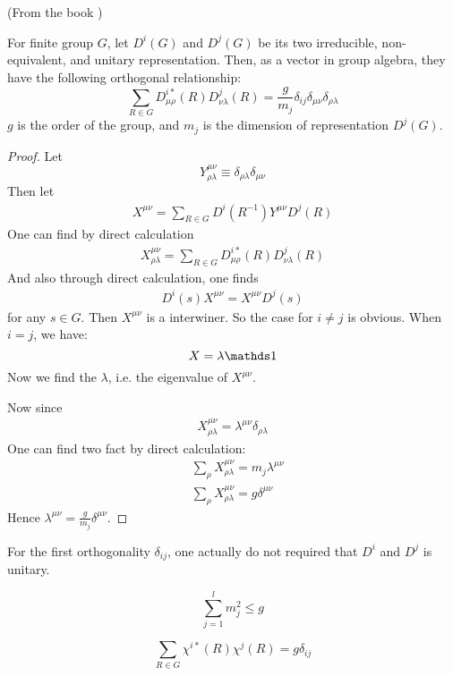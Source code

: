 (From the book \cite{book})
\begin{thm}
    For finite group $G$, let $D^i(G)$ and $D^j(G)$ be its two
    irreducible, non-equivalent, and unitary representation. Then, as
    a vector in group algebra, they have the following orthogonal
    relationship:
    \begin{equation}
        \sum_{R\in G} D^{i*}_{\mu\rho}(R)D^j_{\nu \lambda}(R) =
        \frac{g}{m_j} \delta_{ij} \delta_{\mu\nu}\delta_{\rho\lambda}
    \end{equation}
    $g$ is the order of the group, and $m_j$ is the
    dimension of representation $D^j(G)$.
\end{thm}
\begin{proof}
    Let
    \begin{equation}
        Y_{\rho\lambda}^{\mu\nu} \equiv
        \delta_{\rho\lambda}\delta_{\mu\nu}
    \end{equation}
    Then let
    \begin{align*}
        X^{\mu\nu} = \sum_{R\in G} D^i(R^{-1}) Y^{\mu\nu} D^j(R)
    \end{align*}
    One can find by direct calculation
    \begin{align}
        X^{\mu\nu}_{\rho\lambda}= \sum_{R\in G}
        D^{i*}_{\mu\rho}(R)D^j_{\nu \lambda}(R)
    \end{align}
    And also through direct calculation, one finds
    \begin{align*}
        D^i (s) X^{\mu\nu} = X^{\mu\nu} D^j(s)
    \end{align*}
    for any $s\in G$. 
    Then $X^{\mu\nu}$ is a interwiner. So the case for $i\neq j$ is
    obvious. When $i=j$, we have:
    $$ X = \lambda \id$$
    Now we find the $\lambda$, i.e. the eigenvalue of $X^{\mu\nu}$.
    
    Now since
    \begin{align*}
        X^{\mu\nu}_{\rho\lambda} = \lambda^{\mu\nu}
        \delta_{\rho\lambda}
    \end{align*}
    One can find two fact by direct calculation:
    \begin{align*}
        &\sum_\rho X^{\mu\nu}_{\rho\lambda} = m_j \lambda^{\mu\nu} \\
        &\sum_\rho X^{\mu\nu}_{\rho\lambda} = g \delta^{\mu\nu}
    \end{align*}
    Hence $\lambda^{\mu\nu} = \frac{g}{m_j} \delta^{\mu\nu}$.
\end{proof}
\begin{remark}
    For the first orthogonality $\delta_{ij}$, one actually do not
    required that $D^i$ and $D^j$ is unitary.
\end{remark}
\begin{coro}
    \begin{equation}
        \sum_{j=1}^{l} m_j^2 \leq g
    \end{equation}
\end{coro}
\begin{coro}
    \begin{equation}
        \sum_{R\in G} \chi^{i*}(R)\chi^j(R) = g \delta_{ij}
    \end{equation}
\end{coro}
